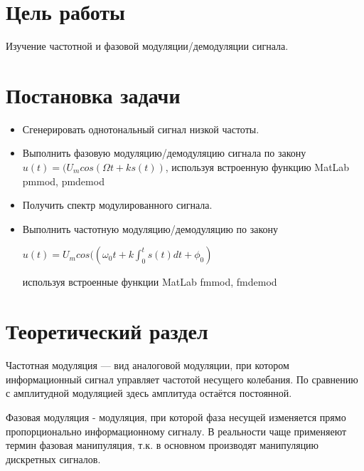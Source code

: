 \documentclass[a4paper]{article}
\begin{document}
\vfill %

\section{Цель работы}
Изучение частотной и фазовой модуляции/демодуляции сигнала.

\section{Постановка задачи}
\begin{itemize}
	\item Сгенерировать однотональный сигнал низкой частоты.
	\item Выполнить фазовую модуляцию/демодуляцию сигнала по закону $u(t)=(U_mcos (\Omega t+ks(t))$, используя встроенную функцию MatLab pmmod, pmdemod
	\item Получить спектр модулированного сигнала.
	\item Выполнить частотную модуляцию/демодуляцию по закону
	
	$u(t)=U_mcos((\omega_0 t+k\int_{0}^{t}s(t)dt+\phi_0)$
	
	используя встроенные функции MatLab fmmod, fmdemod
\end{itemize}


\section{Теоретический раздел}
Частотная модуляция — вид аналоговой модуляции, при котором информационный сигнал управляет частотой несущего колебания. По сравнению с амплитудной модуляцией здесь амплитуда остаётся постоянной. 

Фазовая модуляция - модуляция, при которой фаза несущей изменяется прямо пропорционально информационному сигналу. В реальности чаще применяеют термин фазовая манипуляция, т.к. в основном производят манипуляцию дискретных сигналов.
 
\end{document}
